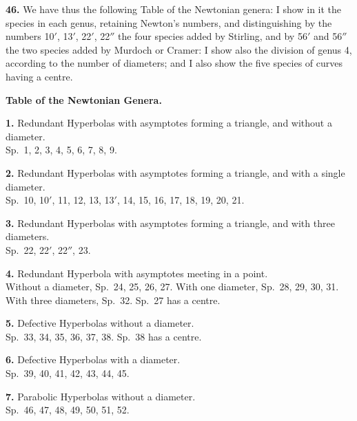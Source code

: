 \documentclass[11pt,a4paper]{article}
\begin{document}
\textbf{46.} We have thus the following Table of the Newtonian genera: I show in it the species in each genus, retaining Newton's numbers, and distinguishing by the numbers 10$'$, 13$'$, 22$'$, 22$''$ the four species added by Stirling, and by 56$'$ and 56$''$ the two species added by Murdoch or Cramer: I show also the division of genus 4, according to the number of diameters; and I also show the five species of curves having a centre.

\medskip

\noindent\textbf{Table of the Newtonian Genera.}

\smallskip

\noindent\textbf{1.} Redundant Hyperbolas with asymptotes forming a triangle, and without a diameter. \\
\quad Sp.\ 1, 2, 3, 4, 5, 6, 7, 8, 9.

\smallskip

\noindent\textbf{2.} Redundant Hyperbolas with asymptotes forming a triangle, and with a single diameter. \\
\quad Sp.\ 10, 10$'$, 11, 12, 13, 13$'$, 14, 15, 16, 17, 18, 19, 20, 21.

\smallskip

\noindent\textbf{3.} Redundant Hyperbolas with asymptotes forming a triangle, and with three diameters. \\
\quad Sp.\ 22, 22$'$, 22$''$, 23.

\smallskip

\noindent\textbf{4.} Redundant Hyperbola with asymptotes meeting in a point. \\
\quad Without a diameter, Sp.\ 24, 25, 26, 27. With one diameter, Sp.\ 28, 29, 30, 31. With three diameters, Sp.\ 32. Sp.\ 27 has a centre.

\smallskip

\noindent\textbf{5.} Defective Hyperbolas without a diameter. \\
\quad Sp.\ 33, 34, 35, 36, 37, 38. Sp.\ 38 has a centre.

\smallskip

\noindent\textbf{6.} Defective Hyperbolas with a diameter. \\
\quad Sp.\ 39, 40, 41, 42, 43, 44, 45.

\smallskip

\noindent\textbf{7.} Parabolic Hyperbolas without a diameter. \\
\quad Sp.\ 46, 47, 48, 49, 50, 51, 52.

\smallskip
\end{document}
